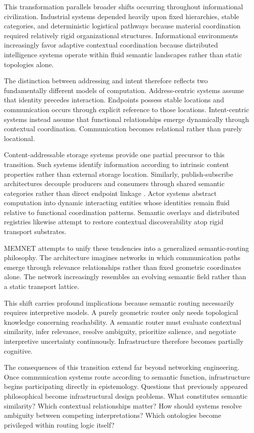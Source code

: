\documentclass[11pt,a4paper]{article}
\begin{document}
This transformation parallels broader shifts occurring throughout informational civilization. Industrial systems depended heavily upon fixed hierarchies, stable categories, and deterministic logistical pathways because material coordination required relatively rigid organizational structures. Informational environments increasingly favor adaptive contextual coordination because distributed intelligence systems operate within fluid semantic landscapes rather than static topologies alone.

The distinction between addressing and intent therefore reflects two fundamentally different models of computation. Address-centric systems assume that identity precedes interaction. Endpoints possess stable locations and communication occurs through explicit reference to those locations. Intent-centric systems instead assume that functional relationships emerge dynamically through contextual coordination. Communication becomes relational rather than purely locational.

Content-addressable storage systems provide one partial precursor to this transition. Such systems identify information according to intrinsic content properties rather than external storage location. Similarly, publish-subscribe architectures decouple producers and consumers through shared semantic categories rather than direct endpoint linkage \cite{pubsub}. Actor systems abstract computation into dynamic interacting entities whose identities remain fluid relative to functional coordination patterns. Semantic overlays and distributed registries likewise attempt to restore contextual discoverability atop rigid transport substrates.

MEMNET attempts to unify these tendencies into a generalized semantic-routing philosophy. The architecture imagines networks in which communication paths emerge through relevance relationships rather than fixed geometric coordinates alone. The network increasingly resembles an evolving semantic field rather than a static transport lattice.

This shift carries profound implications because semantic routing necessarily requires interpretive models. A purely geometric router only needs topological knowledge concerning reachability. A semantic router must evaluate contextual similarity, infer relevance, resolve ambiguity, prioritize salience, and negotiate interpretive uncertainty continuously. Infrastructure therefore becomes partially cognitive.

The consequences of this transition extend far beyond networking engineering. Once communication systems route according to semantic function, infrastructure begins participating directly in epistemology. Questions that previously appeared philosophical become infrastructural design problems. What constitutes semantic similarity? Which contextual relationships matter? How should systems resolve ambiguity between competing interpretations? Which ontologies become privileged within routing logic itself?
\end{document}
